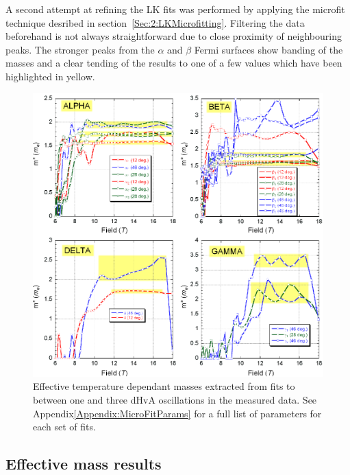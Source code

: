 A second attempt at refining the LK fits was performed by applying the microfit technique desribed in section~\ref{Sec:2:LKMicrofitting}. Filtering the data beforehand is not always straightforward due to close proximity of neighbouring peaks. The stronger peaks from the $\alpha$ and $\beta$ Fermi surfaces show banding of the masses and a clear tending of the results to one of a few values which have been highlighted in yellow.
\begin{figure}[h!]
    \begin{center}
        \includegraphics[scale=0.7]{Chapter3-dHvABaFe2P2/Figures/Mass/MicroFits/MicroFits}
        \caption{Effective temperature dependant masses extracted from fits to between one and three dHvA oscillations in the measured data. See Appendix\ref{Appendix:MicroFitParams} for a full list of parameters for each set of fits.}
        \label{Fig:3:MicroFits}
    \end{center}
\end{figure}

\subsection{Effective mass results}

